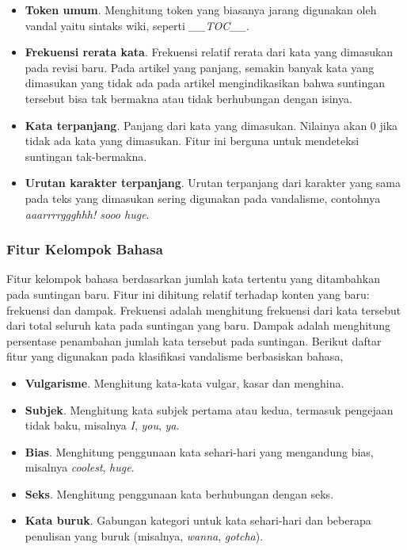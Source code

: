 \begin{itemize}
\item \textbf{Token umum}.
Menghitung token yang biasanya jarang digunakan oleh vandal yaitu sintaks
wiki, seperti \textit{\_\_TOC\_\_}.

\item \textbf{Frekuensi rerata kata}.
Frekuensi relatif rerata dari kata yang dimasukan pada revisi baru.
Pada artikel yang panjang, semakin banyak kata yang dimasukan yang tidak ada
pada artikel mengindikasikan bahwa suntingan tersebut bisa tak bermakna atau
tidak berhubungan dengan isinya.

\item \textbf{Kata terpanjang}.
Panjang dari kata yang dimasukan.
Nilainya akan 0 jika tidak ada kata yang dimasukan.
Fitur ini berguna untuk mendeteksi suntingan tak-bermakna.

\item \textbf{Urutan karakter terpanjang}.
Urutan terpanjang dari karakter yang sama pada teks yang dimasukan sering
digunakan pada vandalisme, contohnya \textit{aaarrrrggghhh! sooo huge}.

\end{itemize}

\subsubsection{Fitur Kelompok Bahasa}

Fitur kelompok bahasa berdasarkan jumlah kata tertentu yang ditambahkan pada
suntingan baru.
Fitur ini dihitung relatif terhadap konten yang baru: frekuensi
dan dampak.
Frekuensi adalah menghitung frekuensi dari kata tersebut dari
total seluruh kata pada suntingan yang baru.
Dampak adalah menghitung persentase penambahan jumlah kata tersebut pada
suntingan.
Berikut daftar fitur yang digunakan pada klasifikasi vandalisme berbasiskan
bahasa,

\begin{itemize}
\item \textbf{Vulgarisme}.
Menghitung kata-kata vulgar, kasar dan menghina.

\item \textbf{Subjek}.
Menghitung kata subjek pertama atau kedua, termasuk pengejaan tidak baku,
misalnya \textit{I}, \textit{you}, \textit{ya}.

\item \textbf{Bias}.
Menghitung penggunaan kata sehari-hari yang mengandung bias, misalnya
\textit{coolest}, \textit{huge}.

\item \textbf{Seks}.
Menghitung penggunaan kata berhubungan dengan seks.

\item \textbf{Kata buruk}.
Gabungan kategori untuk kata sehari-hari dan beberapa penulisan yang buruk
(misalnya, \textit{wanna}, \textit{gotcha}).

\end{itemize}


